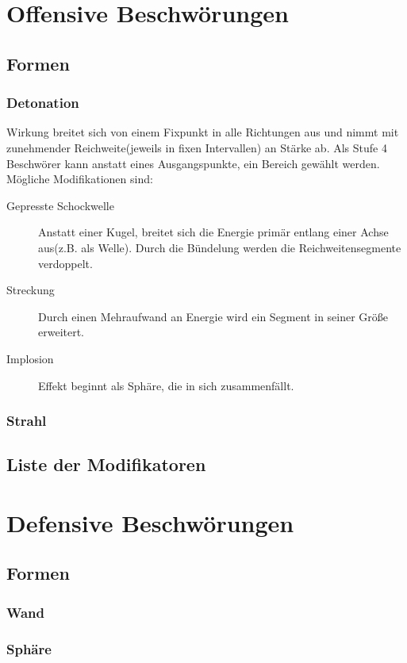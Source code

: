 \documentclass[a4paper,12pt,oneside]{book}
\begin{document}
\part{Offensive Beschwörungen}

\chapter{Formen}
\section{Detonation}
Wirkung breitet sich von einem Fixpunkt in alle Richtungen aus und nimmt mit zunehmender Reichweite(jeweils in fixen Intervallen) an Stärke ab. Als Stufe 4 Beschwörer kann anstatt eines Ausgangspunkte, ein Bereich gewählt werden. Mögliche Modifikationen sind:
\begin{description}
\item[Gepresste Schockwelle]Anstatt einer Kugel, breitet sich die Energie primär entlang einer Achse aus(z.B. als Welle). Durch die Bündelung werden die Reichweitensegmente verdoppelt. 
\item[Streckung]Durch einen Mehraufwand an Energie wird ein Segment in seiner Größe erweitert.
\item[Implosion]Effekt beginnt als Sphäre, die in sich zusammenfällt.
\end{description}

\section{Strahl}

\chapter{Liste der Modifikatoren}

\part{Defensive Beschwörungen}

\chapter{Formen}

\section{Wand}

\section{Sphäre}
\end{document}
